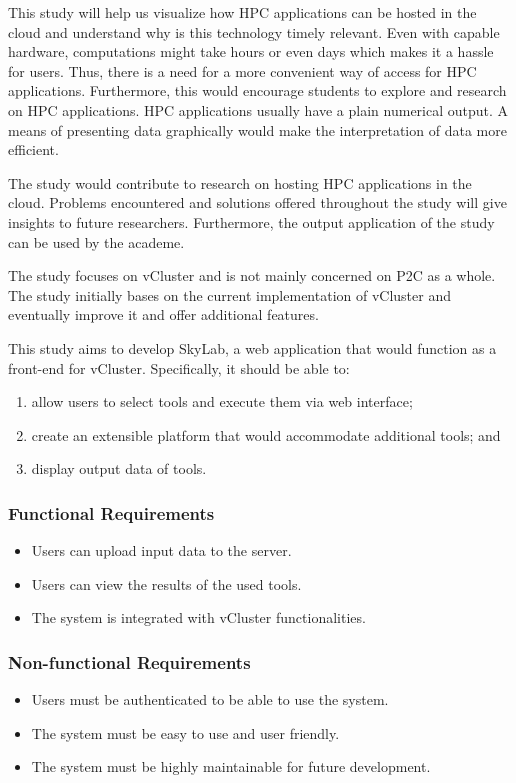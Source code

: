 This study will help us visualize how HPC applications can be hosted in the cloud and understand why is this technology timely relevant.  Even with capable hardware, computations might take hours or even days which makes it a hassle for users. Thus, there is a need for a more convenient way of access for HPC applications. Furthermore, this would encourage students to explore and research on HPC applications. HPC applications usually have a plain numerical output. A means of presenting data graphically would make the interpretation of data more efficient.

The study would contribute to research on hosting HPC applications in the cloud. Problems encountered and solutions offered throughout the study will give insights to future researchers. Furthermore, the output application of the study can be used by the academe.

The study focuses on vCluster and is not mainly concerned on P2C as a whole. The study initially bases on the current implementation of vCluster and eventually improve it and offer additional features\cite {Hermocilla2014}.

This study aims to develop SkyLab, a web application that would function as a front-end for vCluster. 	Specifically, it should be able to: 
	\begin{enumerate}
		\item allow users to select tools and execute them via web interface; 
        \item create an extensible platform that would accommodate additional tools; and
		\item display output data of tools.
	\end{enumerate}

\subsubsection*{Functional Requirements}
	\begin{itemize}
		\item Users can upload input data to the server.
    	\item Users can view the results of the used tools.
    	\item The system is integrated with vCluster functionalities.
    \end{itemize}

\subsubsection*{Non-functional Requirements}
    \begin{itemize}
    	\item Users must be authenticated to be able to use the system.
       	\item The system must be easy to use and user friendly.
       	\item The system must be highly maintainable for future development.  
	\end{itemize}
        

